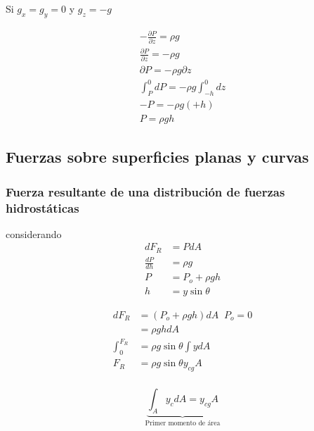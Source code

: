 Si \( g_{x} = g_{y} = 0 \) y \( g_{z} = -g \)

\[
    \begin{split}
        -\frac{ \partial P }{ \partial z } = \rho g \\
        \frac{ \partial P }{ \partial z } = -\rho g \\
        \partial P = -\rho g \partial z \\
        \int_{ P }^{ 0 } dP = - \rho g \int_{ -h }^{ 0 } dz \\
        - P = -\rho g (+h) \\
        P = \rho g h
    \end{split}
\]

\subsection{ Fuerzas sobre superficies planas y curvas }


\subsubsection{Fuerza resultante de una distribución de fuerzas hidrostáticas}

considerando
\[
    \begin{split}
        dF_{R} & = PdA \\
        \frac{ dP }{ dh } & = \rho g \\
        P & = P_{o} + \rho g h \\
        h & = y \sin{ \theta }
    \end{split}
\]

\[
    \begin{split}
        dF_{R} & = ( P_{o} + \rho g h ) dA \;\; P_{o} = 0 \\
        & = \rho g h dA \\
        \int_{0}^{F_{R}} & = \rho g \sin{ \theta } \int y dA \\ 
        F_{R} & = \rho g \sin{ \theta } y_{cg} A \\
    \end{split}
\]

\[
    \underbrace{ \int_{A} y_{c} dA = y_{cg} A }_{\text{Primer momento de área}} 
\]

